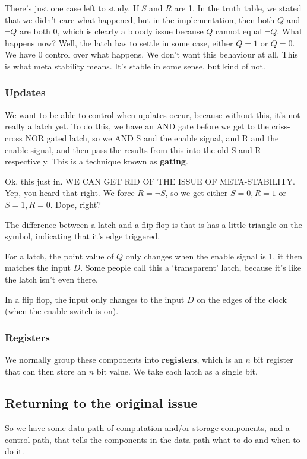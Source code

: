 \documentclass[11pt,a4paper,titlepage,dvipsnames,cmyk]{scrartcl}
\begin{document}
There's just one case left to study. If $S$ and $R$ are 1. In the truth
table, we stated that we didn't care what happened, but in the
implementation, then both $Q$ and $\neg Q$ are both 0, which is clearly a
bloody issue because $Q$ cannot equal $\neg Q$. What happens now? Well,
the latch has to settle in some case, either $Q = 1$ or $Q = 0$. We have 0
control over what happens. We don't want this behaviour at all. This is
what meta stability means. It's stable in some sense, but kind of not.

\subsubsection{Updates}%
\label{ssub:Updates}
We want to be able to control when updates occur, because without this,
it's not really a latch yet. To do this, we have an AND gate before we get
to the criss-cross NOR gated latch, so we AND S and the enable signal, and
R and the enable signal, and then pass the results from this into the old
S and R respectively. This is a technique known as \textbf{gating}.

Ok, this just in. WE CAN GET RID OF THE ISSUE OF META-STABILITY. Yep, you
heard that right. We force $R = \neg S$, so we get either $S = 0, R = 1$
or $S = 1, R = 0$. Dope, right?

The difference between a latch and a flip-flop is that is has a little
triangle on the symbol, indicating that it's edge triggered.

For a latch, the point value of $Q$ only changes when the enable signal is
1, it then matches the input $D$. Some people call this a `transparent'
latch, because it's like the latch isn't even there.

In a flip flop, the input only changes to the input $D$ on the edges of
the clock (when the enable switch is on).

\subsubsection{Registers}%
\label{ssub:Registers}
We normally group these components into \textbf{registers}, which is an
$n$ bit register that can then store an $n$ bit value. We take each latch
as a single bit.

\subsection{Returning to the original issue}%
\label{sub:original}
So we have some data path of computation and/or storage components, and a
control path, that tells the components in the data path what to do and
when to do it.
\end{document}
